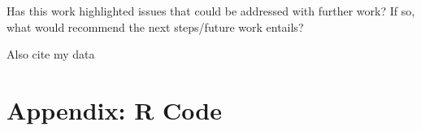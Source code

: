 \documentclass[11pt, oneside]{article}
\begin{document}
Has this work highlighted issues that could be addressed with further work? If so, what would recommend the next steps/future work entails?

\begin{thebibliography}{9}

 
{\color{red}Also cite my data }
 
\end{thebibliography}

\section*{Appendix: R Code}
\end{document}
